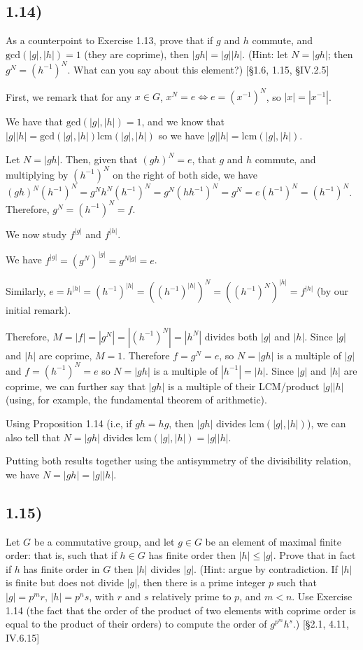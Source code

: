 \subsection*{1.14)}

As a counterpoint to Exercise 1.13, prove that if $g$ and $h$ commute, and $\text{gcd}(|g|, |h|) = 1$ (they are coprime), then $|gh| = |g| |h|$. (Hint: let $N = |gh|$; then $g^N = (h^{-1})^N$. What can you say about this element?) [§1.6, 1.15, §IV.2.5]

First, we remark that for any $x \in G$, $x^N = e \Leftrightarrow e = (x^{-1})^N$, so $|x| = |x^{-1}|$.

We have that $\text{gcd}(|g|, |h|) = 1$, and we know that $|g| |h| = \text{gcd}(|g|, |h|) \text{lcm}(|g|, |h|)$ so we have $|g||h| = \text{lcm}(|g|, |h|)$.

Let $N = |gh|$. Then, given that $(gh)^N = e$, that $g$ and $h$ commute, and multiplying by $(h^{-1})^N$ on the right of both side, we have $(gh)^N(h^{-1})^N = g^N h^N (h^{-1})^N = g^N (hh^{-1})^N = g^N = e(h^{-1})^N = (h^{-1})^N$. Therefore, $g^N = (h^{-1})^N = f$.

We now study $f^{|g|}$ and $f^{|h|}$.

We have $f^{|g|} = (g^N)^{|g|} = g^{N|g|} = e$.

Similarly, $e = h^{|h|} = (h^{-1})^{|h|} = ((h^{-1})^{|h|})^N = ((h^{-1})^N)^{|h|} = f^{|h|}$ (by our initial remark).

Therefore, $M = |f| = |g^N| = |(h^{-1})^N| = |h^N|$ divides both $|g|$ and $|h|$. Since $|g|$ and $|h|$ are coprime, $M = 1$. Therefore $f = g^N = e$, so $N = |gh|$ is a multiple of $|g|$ and $f = (h^{-1})^N = e$ so $N = |gh|$ is a multiple of $|h^{-1}| = |h|$. Since $|g|$ and $|h|$ are coprime, we can further say that $|gh|$ is a multiple of their LCM/product $|g||h|$ (using, for example, the fundamental theorem of arithmetic).

Using Proposition 1.14 (i.e, if $gh = hg$, then $|gh|$ divides $\text{lcm}(|g|, |h|)$), we can also tell that $N = |gh|$ divides $\text{lcm}(|g|, |h|) = |g| |h|$.

Putting both results together using the antisymmetry of the divisibility relation, we have $N = |gh| = |g||h|$.



\subsection*{1.15)}

Let $G$ be a commutative group, and let $g \in G$ be an element of maximal finite order: that is, such that if $h \in G$ has finite order then $|h| \leq |g|$. Prove that in fact if $h$ has finite order in $G$ then $|h|$ divides $|g|$. (Hint: argue by contradiction. If $|h|$ is finite but does not divide $|g|$, then there is a prime integer $p$ such that $|g| = p^m r$, $|h| = p^n s$, with $r$ and $s$ relatively prime to $p$, and $m < n$. Use Exercise 1.14 (the fact that the order of the product of two elements with coprime order is equal to the product of their orders) to compute the order of $g^{p^m} h^s$.) [§2.1, 4.11, IV.6.15]

